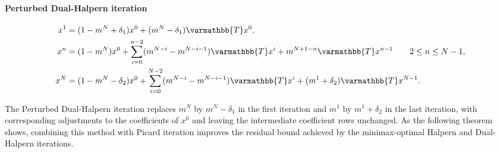 \documentclass[pdflatex,sn-mathphys-num]{sn-jnl}%
\newcommand{\opT}{{\varmathbb{T}}}
\theoremstyle{thmstyleone}%
\newtheorem{theorem}{Theorem}%
\theoremstyle{thmstyletwo}%
\theoremstyle{thmstylethree}%
\begin{document}
\paragraph{Perturbed Dual-Halpern iteration}
\begin{align*}
x^1
&=(1-m^N+\delta_1)x^0+(m^N-\delta_1)\opT x^0,\\
x^n
&=(1-m^N)x^0
+\sum_{i=0}^{n-2}(m^{N-i}-m^{N-i-1})\opT x^i
+m^{N+1-n}\opT x^{n-1} \qquad 2\le n\le N-1,\\
x^N
&=(1-m^N-\delta_2)x^0
+\sum_{i=0}^{N-2}(m^{N-i}-m^{N-i-1})\opT x^i
+(m^1+\delta_2)\opT x^{N-1}.
\end{align*}


The Perturbed Dual-Halpern iteration replaces $m^N$ by $m^N-\delta_1$ in the first iteration and $m^1$ by $m^1+\delta_2$ in the last iteration, with corresponding adjustments to the coefficients of $x^0$ and leaving the intermediate coefficient rows unchanged. As the following theorem shows, combining this method with Picard iteration improves the residual bound achieved by the minimax-optimal Halpern and Dual-Halpern iterations.




\end{document}
